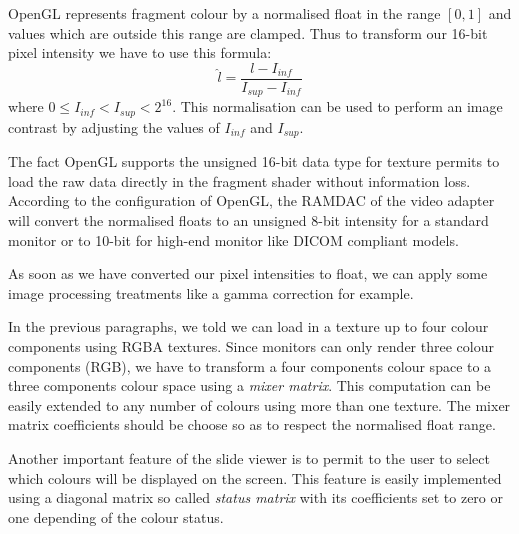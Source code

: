 \documentclass[letterpaper,compsoc,twoside]{IEEEtran}
\begin{document}
OpenGL represents fragment colour by a normalised float in the range $[0,1]$ and values which
are outside this range are clamped. Thus to transform our 16-bit pixel intensity we have to use this
formula:\begin{equation}
\label{normalised luminance}
\hat{l} = \frac{l - I_{inf}}{I_{sup} - I_{inf}}
\end{equation}where $0 \leq I_{inf} < I_{sup} < 2^{16}$. This normalisation can be used to perform an image
contrast by adjusting the values of $I_{inf}$ and $I_{sup}$.

The fact OpenGL supports the unsigned 16-bit data type for texture permits to load the raw data
directly in the fragment shader without information loss. According to the configuration of OpenGL,
the RAMDAC of the video adapter will convert the normalised floats to an unsigned 8-bit intensity
for a standard monitor or to 10-bit for high-end monitor like DICOM compliant models.

As soon as we have converted our pixel intensities to float, we can apply some image processing
treatments like a gamma correction for example.

In the previous paragraphs, we told we can load in a texture up to four colour components using
RGBA textures. Since monitors can only render three colour components (RGB), we have to transform a
four components colour space to a three components colour space using a \emph{mixer matrix}. This
computation can be easily extended to any number of colours using more than one texture. The mixer
matrix coefficients should be choose so as to respect the normalised float range.

Another important feature of the slide viewer is to permit to the user to select which colours will
be displayed on the screen. This feature is easily implemented using a diagonal matrix so called
\emph{status matrix} with its coefficients set to zero or one depending of the colour status.
\end{document}
